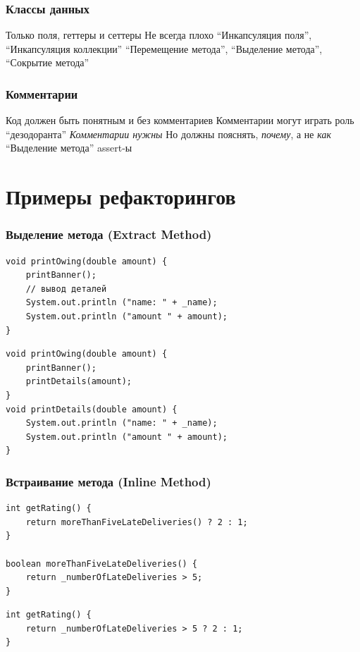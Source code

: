 \documentclass{../../slides-style}
\begin{document}
    \begin{frame}
        \frametitle{Классы данных}
        \begin{outline}
            \1 Только поля, геттеры и сеттеры
            \1 Не всегда плохо
            \1 ``Инкапсуляция поля'', ``Инкапсуляция коллекции''
            \1 ``Перемещение метода'', ``Выделение метода'', ``Сокрытие метода''
        \end{outline}
    \end{frame}

    \begin{frame}
        \frametitle{Комментарии}
        \begin{outline}
            \1 Код должен быть понятным и без комментариев
            \1 Комментарии могут играть роль ``дезодоранта''
            \1 \emph{Комментарии нужны}
                \2 Но должны пояснять, \emph{почему}, а не \emph{как}
            \1 ``Выделение метода''
            \1 assert-ы
        \end{outline}
    \end{frame}

    \section{Примеры рефакторингов}

    \begin{frame}[fragile]
        \frametitle{Выделение метода (Extract Method)}
        \begin{verbatim}
void printOwing(double amount) {
    printBanner();
    // вывод деталей
    System.out.println ("name: " + _name);
    System.out.println ("amount " + amount);
}
        \end{verbatim}
        
        \hspace{2cm}{\Huge{$\Downarrow$}}
        
        \begin{verbatim}
void printOwing(double amount) {
    printBanner();
    printDetails(amount);
}
void printDetails(double amount) {
    System.out.println ("name: " + _name);
    System.out.println ("amount " + amount);
}
        \end{verbatim}
    \end{frame}

    \begin{frame}[fragile]
        \frametitle{Встраивание метода (Inline Method)}
        \begin{verbatim}
int getRating() {
    return moreThanFiveLateDeliveries() ? 2 : 1;
}

boolean moreThanFiveLateDeliveries() {
    return _numberOfLateDeliveries > 5;
}
        \end{verbatim}
        
        \hspace{2cm}{\Huge{$\Downarrow$}}
        
        \begin{verbatim}
int getRating() {
    return _numberOfLateDeliveries > 5 ? 2 : 1;
}
        \end{verbatim}
    \end{frame}
\end{document}
